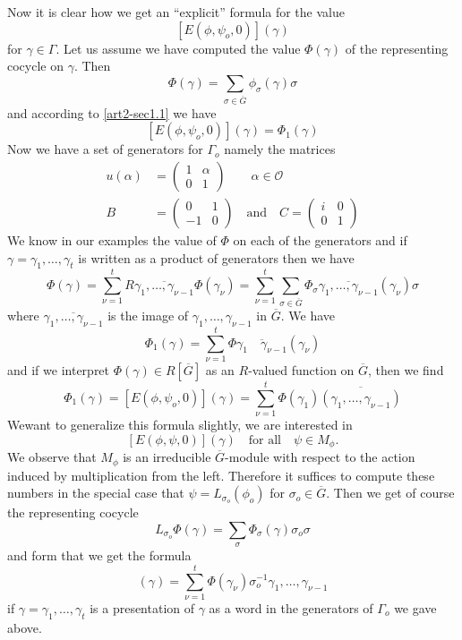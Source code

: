 Now it is clear how we get an ``explicit'' formula for the value
$$
[E(\phi,\psi_{o},0)](\gamma)
$$
for $\gamma\in \Gamma$. Let us assume we have computed the value $\Phi(\gamma)$ of the representing cocycle on $\gamma$. Then
$$
\Phi(\gamma)=\sum\limits_{\sigma\in \overline{G}}\phi_{\sigma}(\gamma)\sigma
$$
and according to \eqref{art2-sec1.1} we have
$$
[E(\phi,\psi_{o},0)](\gamma)=\Phi_{1}(\gamma)
$$
Now we have a set of generators for $\Gamma_{o}$ namely the matrices
\begin{align*}
u(\alpha) &= \left(\begin{matrix} 1 & \alpha\\ 0 & 1\end{matrix}\right)\qquad \alpha\in \mathscr{O}\\[4pt]
B &= \left(\begin{matrix} 0 & 1\\ -1 & 0\end{matrix}\right)\quad\text{and}\quad C=\left(\begin{matrix} i & 0\\ 0 & 1\end{matrix}\right)
\end{align*}
We know in our examples the value of $\Phi$ on each of the generators and if $\gamma=\gamma_{1},\ldots,\gamma_{t}$ is written as a product of generators then we have
$$
\Phi(\gamma)=\sum\limits^{t}_{\nu=1}R\overline{\gamma_{1},\ldots,\gamma_{\nu-1}}\Phi(\gamma_{\nu})=\sum\limits^{t}_{\nu=1}\sum\limits_{\sigma\in\overline{G}}\Phi_{\sigma}\overline{\gamma_{1},\ldots,\gamma_{\nu-1}}(\gamma_{\nu})\sigma
$$
where $\overline{\gamma_{1},\ldots,\gamma_{\nu-1}}$ is the image of $\gamma_{1},\ldots,\gamma_{\nu-1}$ in $\overline{G}$. We have
$$
\Phi_{1}(\gamma)=\sum\limits^{t}_{\nu=1}\Phi\overline{\gamma_{1}\quad \gamma_{\nu-1}}(\gamma_{\nu})
$$
and if we interpret $\Phi(\gamma)\in R[\overline{G}]$ as an $R$-valued function on $\overline{G}$, then we find
$$
\Phi_{1}(\gamma)=[E(\phi,\psi_{o},0)](\gamma)=\sum\limits^{t}_{\nu=1}\Phi(\gamma_{1})\overline{(\gamma_{1},\ldots,\gamma_{\nu-1})}
$$
We\pageoriginale want to generalize this formula slightly, we are interested in 
$$
[E(\phi,\psi,0)](\gamma)\quad\text{for all}\quad \psi\in M_{\phi}.
$$ 
We observe that $M_{\phi}$ is an irreducible $\overline{G}$-module with respect to the action induced by multiplication from the left. Therefore it suffices to compute these numbers in the special case that $\psi=L_{\sigma_{o}}(\phi_{o})$ for $\sigma_{o}\in \overline{G}$. Then we get of course the representing cocycle
$$
L_{\sigma_{o}}\Phi(\gamma)=\sum\limits_{\sigma}\Phi_{\sigma}(\gamma)\sigma_{o}\sigma
$$
and form that we get the formula
\begin{equation*}
[E(\phi,L_{\sigma_{o}}\phi_{o},0)](\gamma)=\sum\limits^{t}_{\nu=1}\Phi(\gamma_{\nu})\sigma^{-1}_{o}\gamma_{1},\ldots,\gamma_{\nu-1}\tag{4.1}\label{art2-eq4.1}
\end{equation*}
if $\gamma=\gamma_{1},\ldots,\gamma_{t}$ is a presentation of $\gamma$ as a word in the generators of $\Gamma_{o}$ we gave above.

